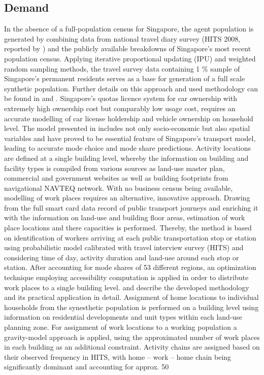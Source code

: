 \subsection{Demand}
In the absence of a full-population census for Singapore, the agent population is generated by combining data from national travel diary survey (HITS 2008, reported by \citet[][]{Choi_JOUR_2010}) and the publicly available breakdowns of Singapore’s most recent population census. Applying iterative proportional updating (IPU) and weighted random sampling methods, the travel survey data containing 1 \% sample of Singapore’s permanent residents serves as a base for generation of a full scale synthetic population. Further details on this approach and used methodology can be found in \citet[][]{FourieMueller_HKSTS_2011} and \citet[][]{CasatiEtAl_TechRep_IVT_2014}. 
Singapore’s quotas licence system for car ownership with extremely high ownership cost but comparably low usage cost, requires an accurate modelling of car license holdership and vehicle ownership on household level. The model presented in \citet[][]{VanEggermondEtAl_IATBR_2012} includes not only socio-economic but also spatial variables and have proved to be essential feature of Singapore’s transport model, leading to accurate mode choice and mode share predictions. 
Activity locations are defined at a single building level, whereby the information on building and facility types is compiled from various sources as land-use master plan, commercial and government websites as well as building footprints from navigational NAVTEQ network. With no business census being available, modelling of work places requires an alternative, innovative approach.  Drawing from the full smart card data record of public transport  journeys and enriching it with the information on land-use and building floor areas, estimation of work place locations and there capacities is performed. Thereby, the method is based on identification of workers arriving at each public transportation stop or station using probabilistic model calibrated with travel interview survey (HITS) and considering time of day, activity duration and land-use around each stop or station. After accounting for mode shares of 53 different regions, an optimization technique employing accessibility computation is applied in order to distribute work places to a single building level.  \citet[][]{ChakirovErath_IATBR_2012} and \citet[][]{OrdonezErath_TRR_2013} describe the developed methodology and its practical application in detail. 
Assignment of home locations to individual households from the synesthetic population is performed on a building level using information on residential developments and unit types within each land-use planning zone. For assignment of work locations to a working population a gravity-model approach is applied, using the approximated number of work places in each building as an additional constraint.  Activity chains are assigned based on their observed frequency in HITS, with home – work – home chain being significantly dominant and accounting for approx. 50%
